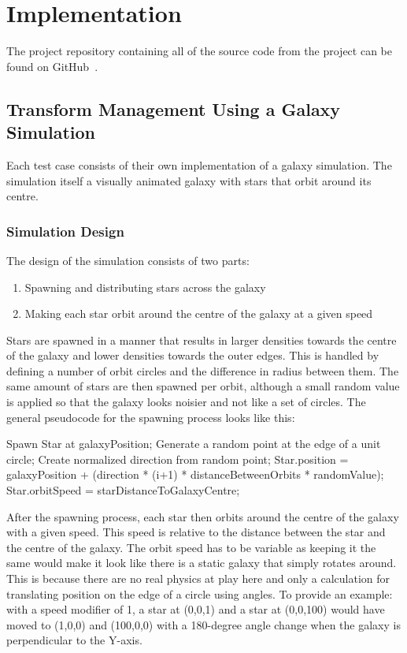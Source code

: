 \chapter{Implementation}\label{chap:implementation}
The project repository containing all of the source code from the project can be found on GitHub~\cite{projectrepo}.

\section{Transform Management Using a Galaxy Simulation}
Each test case consists of their own implementation of a galaxy simulation. The simulation itself a visually animated galaxy with stars that orbit around its centre. 

\subsection{Simulation Design}
The design of the simulation consists of two parts: 
\begin{enumerate}
    \item Spawning and distributing stars across the galaxy
    \item Making each star orbit around the centre of the galaxy at a given speed
\end{enumerate}
Stars are spawned in a manner that results in larger densities towards the centre of the galaxy and lower densities towards the outer edges. This is handled by defining a number of orbit circles and the difference in radius between them. The same amount of stars are then spawned per orbit, although a small random value is applied so that the galaxy looks noisier and not like a set of circles. The general pseudocode for the spawning process looks like this:

\begin{algorithmic}
         \State Spawn Star at galaxyPosition;
         \State Generate a random point at the edge of a unit circle;
         \State Create normalized direction from random point;
         \State Star.position = galaxyPosition +
         \State (direction * (i+1) * distanceBetweenOrbits * randomValue);
         \State Star.orbitSpeed = starDistanceToGalaxyCentre;
    \EndFor
\EndFor
\end{algorithmic}

After the spawning process, each star then orbits around the centre of the galaxy with a given speed. This speed is relative to the distance between the star and the centre of the galaxy. The orbit speed has to be variable as keeping it the same would make it look like there is a static galaxy that simply rotates around. This is because there are no real physics at play here and only a calculation for translating position on the edge of a circle using angles. To provide an example: with a speed modifier of 1, a star at (0,0,1) and a star at (0,0,100) would have moved to (1,0,0) and (100,0,0) with a 180-degree angle change when the galaxy is perpendicular to the Y-axis. 

